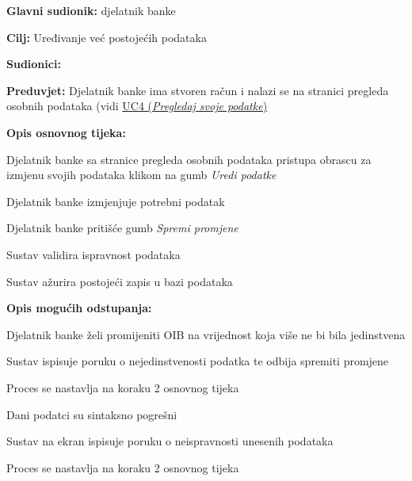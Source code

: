 				
					\noindent {}
					\begin{packed_item}
	
						\item \textbf{Glavni sudionik: }djelatnik banke
						\item  \textbf{Cilj:} Uređivanje već postojećih podataka 
						\item  \textbf{Sudionici:} 
						\item  \textbf{Preduvjet: }Djelatnik banke ima stvoren račun i nalazi se na stranici pregleda osobnih podataka (vidi \hyperref[UC4]{UC4 (\textit{Pregledaj svoje podatke})}
						\item  \textbf{Opis osnovnog tijeka:}
						
						\item[] \begin{packed_enum}
						    \item Djelatnik banke sa stranice pregleda osobnih podataka pristupa obrascu za izmjenu svojih podataka klikom na gumb \textit{Uredi podatke}
	                        \item Djelatnik banke izmjenjuje potrebni podatak 
	                        \item Djelatnik banke pritišće gumb \textit{Spremi promjene}
	                        \item Sustav validira ispravnost podataka
	                        \item Sustav ažurira postojeći zapis u bazi podataka
	                        
						\end{packed_enum}
						
						\item  \textbf{Opis mogućih odstupanja:}
						
						\item[] \begin{packed_item}
	
							\item[4.a] Djelatnik banke želi promijeniti OIB na vrijednost koja više ne bi bila jedinstvena
							\begin{packed_enum}
								\item Sustav ispisuje poruku o nejedinstvenosti podatka te odbija spremiti promjene
								\item Proces se nastavlja na koraku 2 osnovnog tijeka
							\end{packed_enum}
							
							\item[4.b] Dani podatci su sintaksno pogrešni
							\begin{packed_enum}
								\item Sustav na ekran ispisuje poruku o neispravnosti unesenih podataka
								\item Proces se nastavlja na koraku 2 osnovnog tijeka
							\end{packed_enum}
							
						\end{packed_item}
						
					\end{packed_item}
					
